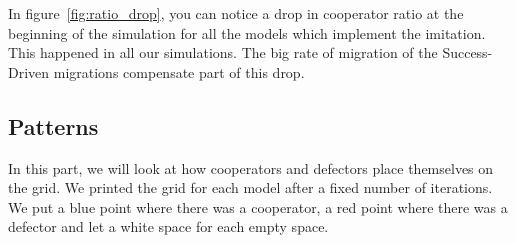 \documentclass[11pt]{article}
\begin{document}
In figure~\ref{fig:ratio_drop}, you can notice a drop in cooperator ratio at the beginning of the simulation for all the models which implement the imitation. This happened in all our simulations. The big rate of migration of the Success-Driven migrations compensate part of this drop.

\newpage
\subsection{Patterns}

In this part, we will look at how cooperators and defectors place themselves on the grid. We printed the grid for each model after a fixed number of iterations. We put a blue point where there was a cooperator, a red point where there was a defector and let a white space for each empty space.
\end{document}
